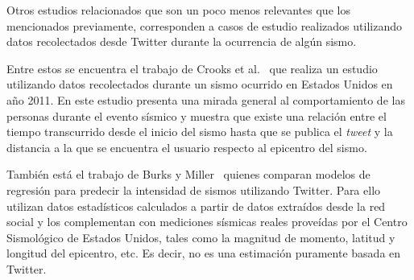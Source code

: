 Otros estudios relacionados que son un poco menos relevantes que los mencionados previamente, corresponden a casos de estudio realizados utilizando datos recolectados desde Twitter durante la ocurrencia de algún sismo. 

Entre estos se encuentra el trabajo de Crooks et al.~\cite{crooks2013earthquake} que realiza un estudio utilizando datos recolectados durante un sismo ocurrido en Estados Unidos en año 2011. En este estudio presenta una mirada general al comportamiento de las personas durante el evento sísmico y muestra que existe una relación entre el tiempo transcurrido desde el inicio del sismo hasta que se publica el {\em tweet} y la distancia a la que se encuentra el usuario respecto al epicentro del sismo. 

También está el trabajo de Burks y Miller~\cite{burks2014rapid} quienes comparan modelos de regresión para predecir la intensidad de sismos utilizando Twitter. Para ello utilizan datos estadísticos calculados a partir de datos extraídos desde la red social y los complementan con mediciones sísmicas reales proveídas por el Centro Sismológico de Estados Unidos, tales como la magnitud de momento, latitud y longitud del epicentro, etc. Es decir, no es una estimación puramente basada en Twitter.
